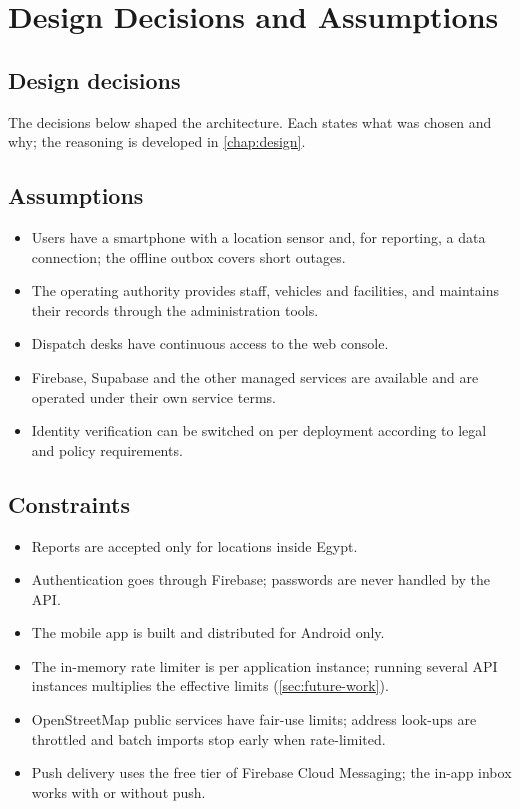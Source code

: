 \chapter{Design Decisions and Assumptions}\label{app:decisions}

\section{Design decisions}
The decisions below shaped the architecture. Each states what was chosen and why; the reasoning is
developed in \cref{chap:design}.


\section{Assumptions}
\begin{itemize}
  \item Users have a smartphone with a location sensor and, for reporting, a data connection; the
        offline outbox covers short outages.
  \item The operating authority provides staff, vehicles and facilities, and maintains their records through
        the administration tools.
  \item Dispatch desks have continuous access to the web console.
  \item Firebase, Supabase and the other managed services are available and are operated under their own
        service terms.
  \item Identity verification can be switched on per deployment according to legal and policy requirements.
\end{itemize}

\section{Constraints}
\begin{itemize}
  \item Reports are accepted only for locations inside Egypt.
  \item Authentication goes through Firebase; passwords are never handled by the API.
  \item The mobile app is built and distributed for Android only.
  \item The in-memory rate limiter is per application instance; running several API instances multiplies the
        effective limits (\cref{sec:future-work}).
  \item OpenStreetMap public services have fair-use limits; address look-ups are throttled and batch imports stop
        early when rate-limited.
  \item Push delivery uses the free tier of Firebase Cloud Messaging; the in-app inbox works with or without push.
\end{itemize}
